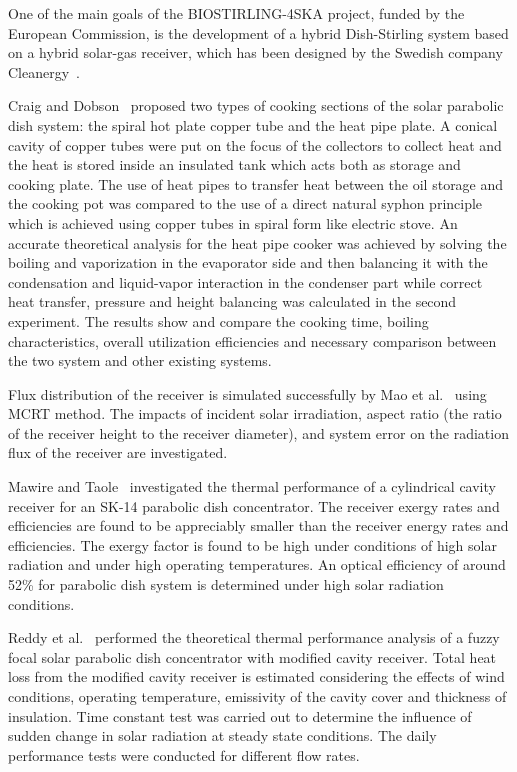 One of the main goals of the BIOSTIRLING-4SKA project, funded by the European Commission, is the development of a hybrid Dish-Stirling system based on a hybrid solar-gas receiver, which has been designed by the Swedish company Cleanergy~\cite{Blazquez2016}.

Craig and Dobson~\cite{Craig2016b} proposed two types of cooking sections of the solar parabolic dish system: the spiral hot plate copper tube and the heat pipe plate. A conical cavity of copper tubes were put on the focus of the collectors to collect heat and the heat is stored inside an insulated tank which acts both as storage and cooking plate. The use of heat pipes to transfer heat between the oil storage and the cooking pot was compared to the use of a direct natural syphon principle which is achieved using copper tubes in spiral form like electric stove. An accurate theoretical analysis for the heat pipe cooker was achieved by solving the boiling and vaporization in the evaporator side and then balancing it with the condensation and liquid-vapor interaction in the condenser part while correct heat transfer, pressure and height balancing was calculated in the second experiment. The results show and compare the cooking time, boiling characteristics, overall utilization efficiencies and necessary comparison between the two system and other existing systems.

Flux distribution of the receiver is simulated successfully by Mao et al.~\cite{Mao2014b} using MCRT method. The impacts of incident solar irradiation, aspect ratio (the ratio of the receiver height to the receiver diameter), and system error on the radiation flux of the receiver are investigated.

Mawire and Taole~\cite{Mawire2014} investigated the thermal performance of a cylindrical cavity receiver for an SK-14 parabolic dish concentrator. The receiver exergy rates and efficiencies are found to be appreciably smaller than the receiver energy rates and efficiencies. The exergy factor is found to be high under conditions of high solar radiation and under high operating temperatures. An optical efficiency of around 52\% for parabolic dish system is determined under high solar radiation conditions.

Reddy et al.~\cite{Reddy2015,Reddy2015_2} performed the theoretical thermal performance analysis of a fuzzy focal solar parabolic dish concentrator with modified cavity receiver. Total heat loss from the modified cavity receiver is estimated considering the effects of wind conditions, operating temperature, emissivity of the cavity cover and thickness of insulation. Time constant test was carried out to determine the influence of sudden change in solar radiation at steady state conditions. The daily performance tests were conducted for different flow rates.

